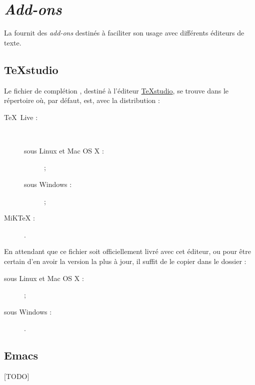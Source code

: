 \chapter{\emph{Add-ons}}\label{cha:add-ons}

La \yatcl{} fournit des \emph{add-ons} destinés à faciliter son usage avec
différents éditeurs de texte.

\section{TeXstudio}
\label{sec:texstudio}

Le fichier de complétion , destiné à l'éditeur
\href{http://texstudio.sourceforge.net/}{TeXstudio}, se trouve dans le
répertoire  où,
par défaut,  est, avec la distribution :
\begin{description}
\item[\TeX{}~Live :]\
  \begin{description}
  \item[sous Linux et Mac OS X :] \unixtldirectory\tldistdirectory\versiontl ;
  \item[sous Windows :] \wintldirectory\tldistdirectory\versiontl ;
  \end{description}
\item[MiK\TeX{} :] \miktexdistdirectory.
\end{description}
En attendant que ce fichier soit officiellement livré avec cet éditeur, ou pour
être certain d'en avoir la version la plus à jour, il suffit de le copier dans
le dossier :
\begin{description}
\item[sous Linux et Mac OS X :]  ;
\item[sous Windows :] .
\end{description}

\section{Emacs}
\label{sec:emacs}

[TODO]
%
\iffalse
\fi

